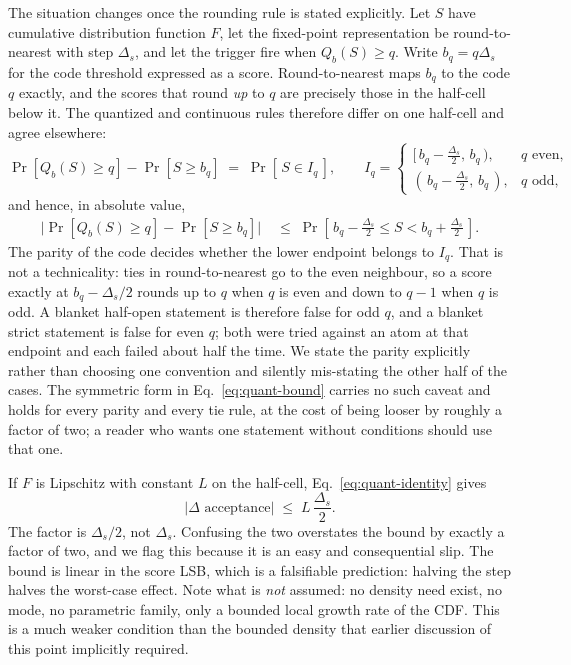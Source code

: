 \documentclass[preprint,12pt]{elsarticle}
\newcounter{bla}
\begin{document}
The situation changes once the rounding rule is stated explicitly.  Let $S$ have
cumulative distribution function $F$, let the fixed-point representation be
round-to-nearest with step $\Delta_s$, and let the trigger fire when
$Q_b(S)\ge q$.  Write $b_q = q\Delta_s$ for the code threshold expressed as a
score.  Round-to-nearest maps $b_q$ to the code $q$ exactly, and the scores that
round \emph{up} to $q$ are precisely those in the half-cell below it.  The
quantized and continuous rules therefore differ on one half-cell and agree
elsewhere:
\begin{equation}
 \Pr[Q_b(S)\ge q]-\Pr[S\ge b_q]
 \;=\; \Pr\!\left[\,S\in I_q\,\right],
 \qquad
 I_q =
 \begin{cases}
  [\,b_q-\tfrac{\Delta_s}{2},\,b_q\,), & q \text{ even},\\[2pt]
  (\,b_q-\tfrac{\Delta_s}{2},\,b_q\,), & q \text{ odd},
 \end{cases}
 \label{eq:quant-identity}
\end{equation}
and hence, in absolute value,
\begin{equation}
 \begin{aligned}
 \bigl|\Pr[Q_b(S)\ge q]-\Pr[S\ge b_q]\bigr|
 &\;\le\; \Pr\!\left[\,b_q-\tfrac{\Delta_s}{2}\le S<b_q+\tfrac{\Delta_s}{2}\,\right].
 \end{aligned}
 \label{eq:quant-bound}
\end{equation}
The parity of the code decides whether the lower endpoint belongs to $I_q$.  That
is not a technicality: ties in round-to-nearest go to the even neighbour, so a
score exactly at $b_q-\Delta_s/2$ rounds up to $q$ when $q$ is even and down to
$q-1$ when $q$ is odd.  A blanket half-open statement is therefore false for odd
$q$, and a blanket strict statement is false for even $q$; both were tried
against an atom at that endpoint and each failed about half the time.  We state
the parity explicitly rather than choosing one convention and silently
mis-stating the other half of the cases.  The symmetric form in
Eq.~\eqref{eq:quant-bound} carries no such caveat and holds for every parity and
every tie rule, at the cost of being looser by roughly a factor of two; a reader
who wants one statement without conditions should use that one.

If $F$ is Lipschitz with constant $L$ on the half-cell, Eq.~\eqref{eq:quant-identity}
gives
\begin{equation}
 \bigl|\Delta\text{ acceptance}\bigr| \;\le\; L\,\frac{\Delta_s}{2} .
 \label{eq:quant-lipschitz}
\end{equation}
The factor is $\Delta_s/2$, not $\Delta_s$.  Confusing the two overstates the
bound by exactly a factor of two, and we flag this because it is an easy and
consequential slip.  The bound is linear in the score LSB, which is a falsifiable
prediction: halving the step halves the worst-case effect.  Note what is
\emph{not} assumed: no density need exist, no mode, no parametric family, only a
bounded local growth rate of the CDF.  This is a much weaker condition than the
bounded density that earlier discussion of this point implicitly required.
\end{document}
